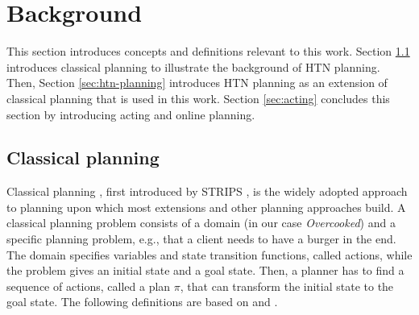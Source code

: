 \section{Background}\label{sec:background}

This section introduces concepts and definitions relevant to this work.
Section \ref{sec:classical-planning} introduces classical planning to illustrate the background of \ac{HTN} planning.
Then, Section \ref{sec:htn-planning} introduces \ac{HTN} planning as an extension of classical planning that is used in this work.
Section \ref{sec:acting} concludes this section by introducing acting and online planning.



\subsection{Classical planning}\label{sec:classical-planning}

Classical planning \citep{ghallabAutomatedPlanningTheory2004}, first introduced by STRIPS \citep{fikesSTRIPSNewApproach1971}, is the widely adopted approach to planning upon which most extensions and other planning approaches build.
A classical planning problem consists of a domain (in our case \textit{Overcooked}) and a specific planning problem, e.g., that a client needs to have a burger in the end.
The domain specifies variables and state transition functions, called actions, while the problem gives an initial state and a goal state.
Then, a planner has to find a sequence of actions, called a plan $\pi$, that can transform the initial state to the goal state.
The following definitions are based on \cite{ghallabAutomatedPlanningTheory2004} and \cite{hollerGuidingSearchHTN2019}.

